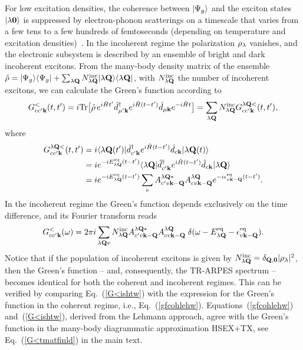 \documentclass[twocolumn,aps,a4paper,superscriptaddress]{revtex4-2}
\begin{document}
\begin{widetext}
For low excitation densities, the coherence between $|\Psi_{g}\rangle$ and the exciton states
$|\lambda\mathbf 0\rangle$ is suppressed by electron-phonon scatterings on a
timescale that varies from a few tens to a few hundreds of
femtoseconds (depending on temperature and excitation
densities)~\cite{moody_intrinsic_2015,selig_exciton_2016,jakubczyk_impact_2018}. In the incoherent regime the
polarization $\rho_{\lambda}$ vanishes, and the
electronic subsystem is described by an ensemble of bright and dark
incoherent excitons. From the many-body density matrix of the ensemble
$\hat{\rho}=|\Psi_{g}\rangle\langle\Psi_{g}|+\sum_{\lambda{\mathbf Q}}N^{\rm
inc}_{\lambda{\mathbf Q}}|\lambda{\mathbf Q}\rangle\langle\lambda{\mathbf Q}|$, with $N^{\rm inc}_{\lambda{\mathbf Q}}$
the number of incoherent excitons,  we can calculate
the Green's function  according to
\begin{align}
G^{<}_{cc'{\mathbf k}}(t,t')=i{\rm Tr}\big[\hat{\rho}\,e^{i\hat{H}t'}\hat{d}^{\dag}_{\mu'{\mathbf k}}e^{i\hat{H}(t-t')}
\hat{d}_{\mu{\mathbf k}}e^{-i\hat{H}t}\big]=
\sum_{\lambda{\mathbf Q}}N^{\rm
inc}_{\lambda{\mathbf Q}}G^{\lambda{\mathbf Q}<}_{cc'{\mathbf k}}(t,t'),
\label{g<ens}
\end{align}
where
\begin{align}
G^{\lambda{\mathbf Q}<}_{cc'{\mathbf k}}(t,t')&=i\langle\lambda{\mathbf Q}(t')|
\hat{d}^{\dag}_{c'{\mathbf k}}e^{i\hat{H}(t-t')}\hat{d}_{c{\mathbf k}}|\lambda{\mathbf Q}(t)\rangle
\nonumber\\
&=ie^{-iE^{\rm eq}_{\lambda{\mathbf Q}}(t-t')}
\langle\lambda{\mathbf Q}|\hat{d}^{\dag}_{c'{\mathbf k}}e^{i\hat{H}(t-t')}\hat{d}_{c{\mathbf k}}|\lambda{\mathbf Q}\rangle
\nonumber\\
&=ie^{-iE^{\rm eq}_{\lambda{\mathbf Q}}(t-t')}\sum_{v}
A^{\lambda{\mathbf Q}\ast}_{c'v{\mathbf k}-{\mathbf Q}}A^{\lambda{\mathbf Q}}_{cv{\mathbf k}-{\mathbf Q}}
e^{-i\epsilon^{\rm eq}_{v{\mathbf k}-{\mathbf Q}}(t-t')}.
\label{G<isht}
\end{align}
In the incoherent regime the Green's function depends exclusively on
the time difference, and its Fourier transform reads
\begin{align}
G^{<}_{cc'{\mathbf k}}(\omega)=2\pi i\sum_{\lambda{\mathbf Q} v}N^{\rm inc}_{\lambda{\mathbf Q}}
A^{\lambda{\mathbf Q}\ast}_{c'v{\mathbf k}-{\mathbf Q}}A^{\lambda{\mathbf Q}}_{cv{\mathbf k}-{\mathbf Q}}\;
\delta(\omega-E^{\rm eq}_{\lambda{\mathbf Q}}-\epsilon^{\rm eq}_{v{\mathbf k}-{\mathbf Q}}).
\label{G<ishtw}
\end{align}
Notice that if the population of incoherent excitons is given by
$N^{\rm inc}_{\lambda{\mathbf Q}}=\delta_{{\mathbf Q},\mathbf 0}|\rho_{\lambda}|^{2}$, then the Green's
function -- and, consequently, the TR-ARPES spectrum -- becomes
identical for both the coherent and incoherent regimes.
This can be verified by comparing Eq.~(\ref{G<ishtw}) with the expression for the
Green's function in the coherent regime,
i.e., Eq.~(\ref{gfcohlehw}). Equations~(\ref{gfcohlehw})
and~(\ref{G<ishtw}), derived from the Lehmann approach,
agree with the Green's function in the many-body diagrammatic
approximation HSEX+TX, see Eq.~(\ref{G<tmatfinld}) in the main text.


\end{widetext}
\end{document}
